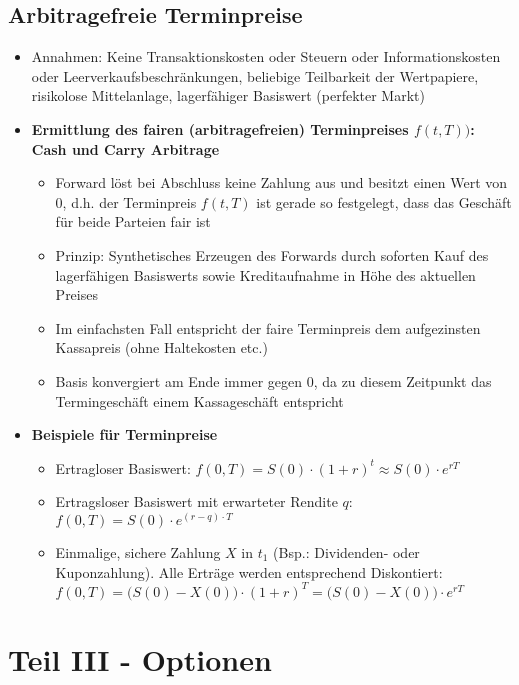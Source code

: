 \subsection{Arbitragefreie Terminpreise}
\begin{itemize}
	\item Annahmen: Keine Transaktionskosten oder Steuern oder Informationskosten oder Leerverkaufsbeschränkungen, beliebige Teilbarkeit der Wertpapiere, risikolose Mittelanlage, lagerfähiger Basiswert (perfekter Markt)
	\item \textbf{Ermittlung des fairen (arbitragefreien) Terminpreises \(f(t,T))\): Cash und Carry Arbitrage}
	\begin{itemize}
		\item Forward löst bei Abschluss keine Zahlung aus und besitzt einen Wert von \(0\), d.h. der Terminpreis \(f(t,T)\) ist gerade so festgelegt, dass das Geschäft für beide Parteien fair ist
		\item Prinzip: Synthetisches Erzeugen des Forwards durch soforten Kauf des lagerfähigen Basiswerts sowie Kreditaufnahme in Höhe des aktuellen Preises
		\item Im einfachsten Fall entspricht der faire Terminpreis dem aufgezinsten Kassapreis (ohne Haltekosten etc.)
		\item Basis konvergiert am Ende immer gegen \(0\), da zu diesem Zeitpunkt das Termingeschäft einem Kassageschäft entspricht
	\end{itemize}
	\item \textbf{Beispiele für Terminpreise}
	\begin{itemize}
		\item Ertragloser Basiswert: \(f(0,T) = S(0)\cdot(1+r)^t \approx S(0) \cdot e^{rT}\)
		\item Ertragsloser Basiswert mit erwarteter Rendite \(q\): \(f(0,T) = S(0) \cdot e^{(r-q)\cdot T}\)
		\item Einmalige, sichere Zahlung \(X\) in \(t_1\) (Bsp.: Dividenden- oder Kuponzahlung). Alle Erträge werden entsprechend Diskontiert: \(f(0,T) = \big(S(0)-X(0)\big)\cdot (1+r)^T = \big(S(0)-X(0)\big)\cdot e^{rT}\)
	\end{itemize}
\end{itemize}



\section{Teil III - Optionen}

